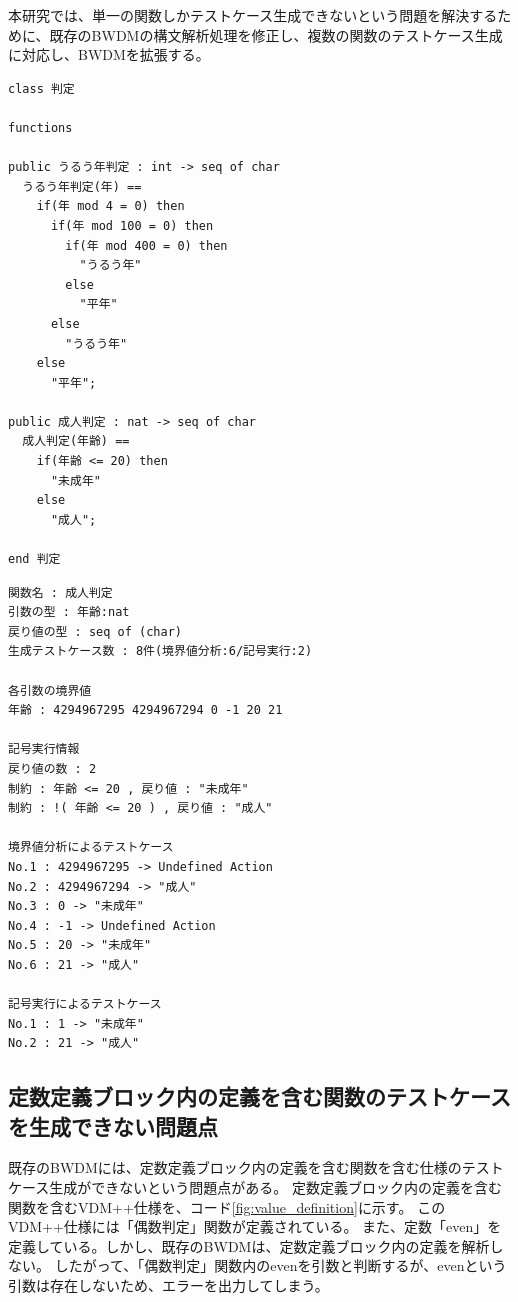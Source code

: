 \documentclass[uplatex, report, a4j, 10pt]{jsbook}
\newcommand{\tool}{BWDM}
\begin{document}
本研究では、単一の関数しかテストケース生成できないという問題を解決するために、既存の\tool{}の構文解析処理を修正し、複数の関数のテストケース生成に対応し、\tool{}を拡張する。

\lstset{language=}
\noindent\begin{minipage}{\textwidth}
  \begin{lstlisting}[caption=複数の関数を含むVDM++仕様,label=fig:func_multiple]
class 判定

functions

public うるう年判定 : int -> seq of char
  うるう年判定(年) ==
    if(年 mod 4 = 0) then
      if(年 mod 100 = 0) then
        if(年 mod 400 = 0) then
          "うるう年"
        else
          "平年"
      else
        "うるう年"
    else
      "平年";

public 成人判定 : nat -> seq of char
  成人判定(年齢) ==
    if(年齢 <= 20) then
      "未成年"
    else
      "成人";

end 判定
\end{lstlisting}
\end{minipage}

\lstset{language=}
\noindent\begin{minipage}{\textwidth}
  \begin{lstlisting}[caption=コード\ref{fig:func_multiple}のVDM++仕様を既存のBWDMに適用した際の出力,label=fig:func_multiple_result]
関数名 : 成人判定
引数の型 : 年齢:nat 
戻り値の型 : seq of (char)
生成テストケース数 : 8件(境界値分析:6/記号実行:2)

各引数の境界値
年齢 : 4294967295 4294967294 0 -1 20 21 

記号実行情報
戻り値の数 : 2
制約 : 年齢 <= 20 , 戻り値 : "未成年"
制約 : !( 年齢 <= 20 ) , 戻り値 : "成人"

境界値分析によるテストケース
No.1 : 4294967295 -> Undefined Action
No.2 : 4294967294 -> "成人"
No.3 : 0 -> "未成年"
No.4 : -1 -> Undefined Action
No.5 : 20 -> "未成年"
No.6 : 21 -> "成人"

記号実行によるテストケース
No.1 : 1 -> "未成年"
No.2 : 21 -> "成人"
\end{lstlisting}
\end{minipage}

\subsection{定数定義ブロック内の定義を含む関数のテストケースを生成できない問題点}\label{sec:probrem_value}
既存の\tool{}には、定数定義ブロック内の定義を含む関数を含む仕様のテストケース生成ができないという問題点がある。
定数定義ブロック内の定義を含む関数を含むVDM++仕様を、コード\ref{fig:value_definition}に示す。
このVDM++仕様には「偶数判定」関数が定義されている。
また、定数「even」を定義している。しかし、既存のBWDMは、定数定義ブロック内の定義を解析しない。
したがって、「偶数判定」関数内のevenを引数と判断するが、evenという引数は存在しないため、エラーを出力してしまう。
\end{document}
